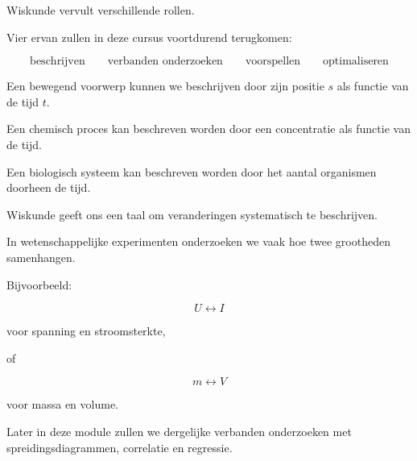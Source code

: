 \documentclass{ximera}
\begin{document}


Wiskunde vervult verschillende rollen.

Vier ervan zullen in deze cursus voortdurend terugkomen:

\[
\boxed{
\text{beschrijven}
\qquad
\text{verbanden onderzoeken}
\qquad
\text{voorspellen}
\qquad
\text{optimaliseren}
}
\]




Een bewegend voorwerp kunnen we beschrijven door zijn positie $s$ als
functie van de tijd $t$.

Een chemisch proces kan beschreven worden door een concentratie als
functie van de tijd.

Een biologisch systeem kan beschreven worden door het aantal organismen
doorheen de tijd.

Wiskunde geeft ons een taal om veranderingen systematisch te
beschrijven.




In wetenschappelijke experimenten onderzoeken we vaak hoe twee
grootheden samenhangen.

Bijvoorbeeld:

\[
U \longleftrightarrow I
\]

voor spanning en stroomsterkte,

of

\[
m \longleftrightarrow V
\]

voor massa en volume.

Later in deze module zullen we dergelijke verbanden onderzoeken met
spreidingsdiagrammen, correlatie en regressie.



\end{document}
